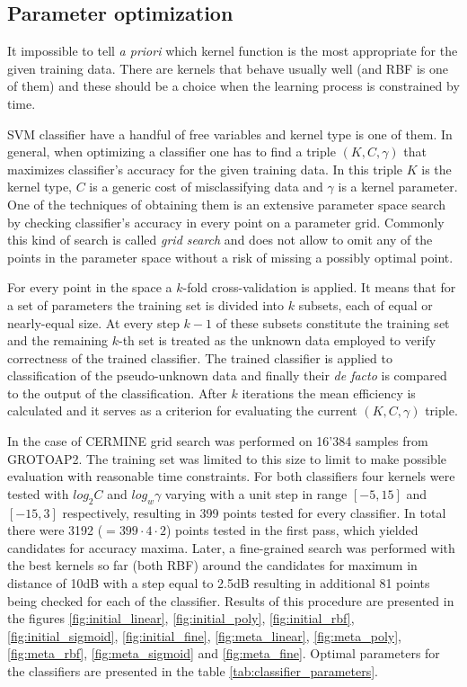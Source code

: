 \subsection{Parameter optimization}
\label{sec:svm_optimization}
It impossible to tell \textit{a priori} which kernel function is the most appropriate for the given training data. There are kernels that behave usually well (and RBF is one of them) and these should be a choice when the learning process is constrained by time.

SVM classifier have a handful of free variables and kernel type is one of them. In general, when optimizing a classifier one has to find a triple $(K, C, \gamma)$ that maximizes classifier's accuracy for the given training data. In this triple $K$ is the kernel type, $C$ is a generic cost of misclassifying data and $\gamma$ is a kernel parameter. One of the techniques of obtaining them is an extensive parameter space search by checking classifier's accuracy in every point on a parameter grid. Commonly this kind of search is called \textit{grid search} and does not allow to omit any of the points in the parameter space without a risk of missing a possibly optimal point.

For every point in the space a $k$-fold cross-validation is applied. It means that for a set of parameters the training set is divided into $k$ subsets, each of equal or nearly-equal size. At every step $k-1$ of these subsets constitute the training set and the remaining $k$-th set is treated as the unknown data employed to verify correctness of the trained classifier. The trained classifier is applied to classification of the pseudo-unknown data and finally their \textit{de facto} is compared to the output of the classification. After $k$ iterations the mean efficiency is calculated and it serves as a criterion for evaluating the current $(K, C, \gamma)$ triple.


In the case of CERMINE grid search was performed on 16'384 samples from GROTOAP2. The training set was limited to this size to limit to make possible evaluation with reasonable time constraints. For both classifiers four kernels were tested with $log_{2}C$ and $log_{w}\gamma$ varying with a unit step in range $[-5,15]$ and $[-15,3]$ respectively, resulting in 399 points tested for every classifier. In total there were 3192 ($=399\cdot4\cdot2$) points tested in the first pass, which yielded candidates for accuracy maxima. Later, a fine-grained search was performed with the best kernels so far (both RBF) around the candidates for maximum in distance of 10dB with a step equal to 2.5dB resulting in additional 81 points being checked for each of the classifier. Results of this procedure are presented in the figures \ref{fig:initial_linear}, \ref{fig:initial_poly}, \ref{fig:initial_rbf}, \ref{fig:initial_sigmoid}, \ref{fig:initial_fine}, \ref{fig:meta_linear}, \ref{fig:meta_poly}, \ref{fig:meta_rbf}, \ref{fig:meta_sigmoid} and \ref{fig:meta_fine}. Optimal parameters for the classifiers are presented in the table \ref{tab:classifier_parameters}.

